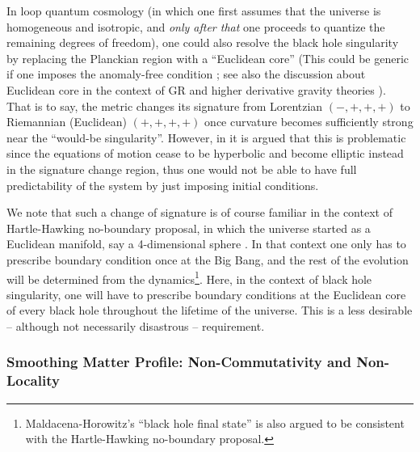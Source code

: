 \documentclass[12pt]{article}
\newcommand{\2}{$^2$}
\newcommand{\3}{$^3$}
\newcommand{\4}{$_4$}
\newcommand{\5}{$_5$}
\begin{document}
In loop quantum cosmology (in which one first assumes that the universe is homogeneous and isotropic, and \emph{only after that} one proceeds to quantize the remaining degrees of freedom), one could also resolve the black hole singularity by replacing the Planckian region with a ``Euclidean core'' (This could be generic if one imposes the anomaly-free condition \cite{Bojowald}; see also the discussion about Euclidean core in the context of GR and higher derivative gravity theories \cite{hirayama}). That is to say, the metric changes its signature from Lorentzian $(-,+,+,+)$ to Riemannian (Euclidean) $(+,+,+,+)$ once curvature becomes sufficiently strong near the ``would-be singularity''. However, in \cite{Bojowald} it is argued that this is problematic since the equations of motion cease to be hyperbolic and become elliptic instead in the signature change region, thus one would not be able to have full predictability of the system by just imposing initial conditions. 

We note that such a change of signature is of course familiar in the context of Hartle-Hawking no-boundary proposal, in which the universe started as a Euclidean manifold, say a 4-dimensional sphere \cite{HartleHawking}. In that context one only has to prescribe boundary condition once at the Big Bang, and the rest of the evolution will be determined from the dynamics\footnote{Maldacena-Horowitz's ``black hole final state'' \cite{MalHor} is also argued to be consistent with the Hartle-Hawking no-boundary proposal.}. Here, in the context of black hole singularity, one will have to prescribe boundary conditions at the Euclidean core of  every black hole throughout the lifetime of the universe. This is a less desirable -- although not necessarily disastrous -- requirement.


\subsubsection{Smoothing Matter Profile: Non-Commutativity and Non-Locality}\label{smoothing}
\end{document}
